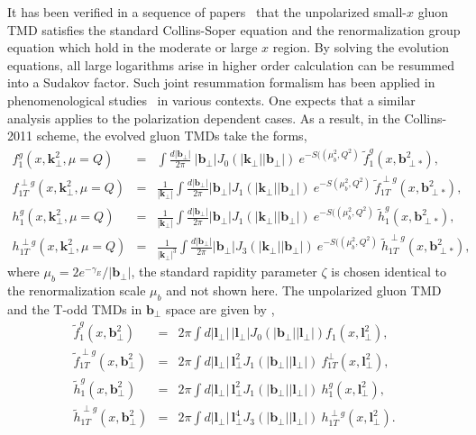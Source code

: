 \documentclass[prd,aps,preprintnumbers,fleqn,showpacs,nofootinbib,superscriptaddress]{revtex4}
\begin{document}
 It has been verified in a sequence of papers~\cite{Mueller:2013wwa,Zhou:2016tfe,Xiao:2017yya,Zhou:2018lfq} that the unpolarized small-$x$ gluon TMD
 satisfies the standard  Collins-Soper equation and the renormalization  group equation which hold in the
 moderate or large $x$ region. By solving the evolution equations, all large logarithms arise in higher
 order calculation can be resummed into a Sudakov factor. Such joint resummation formalism has been applied in  phenomenological studies~\cite{Zheng:2014vka,vanHameren:2014ala,Boer:2017xpy,vanHameren:2019ysa,Stasto:2018rci,Marquet:2019ltn} in various contexts. One expects that a similar analysis applies to the  polarization dependent cases. As a result, in the Collins-2011 scheme, the evolved gluon TMDs take the forms,
 \begin{eqnarray}
  f_{1}^g (x,\bm{k}_\perp^2,\mu=Q)
 &=& \int \frac{ d |\bm{b}_{\perp}|}{2\pi} ~|\bm{b}_{\perp}| J_0(|\bm{k}_{\perp}|| \bm{b}_{\perp}|)~
 e^{-S((\mu_b^2,Q^2)}~
  \tilde f_{1}^g(x,\bm{b}_{\perp*}^2),
\\
   f_{1T}^{\perp g } (x,\bm{k}_\perp^2,\mu=Q)&=& \frac{1}{|\bm{k}_{\perp}|}
  \int\frac{ d |\bm{b}_{\perp}|}{2\pi} |\bm{b}_{\perp}|
  J_1(|\bm{k}_{\perp}||\bm{b}_{\perp}|)~ e^{-S(\mu_b^2,Q^2)}~
    \tilde f_{1T}^{\perp g }(x,\bm{b}_{\perp*}^2), \label{f1t}
\\
h_{1}^{ g}(x,\bm{k}_\perp^2,\mu=Q)&=&\frac{1}{|\bm{k}_{\perp}|}
  \int \frac{ d |\bm{b}_{\perp}|}{2\pi} |\bm{b}_{\perp}|
  J_1(|\bm{k}_{\perp}||\bm{b}_{\perp}|)~e^{-S((\mu_b^2,Q^2)}~
    \tilde h_{1}^{ g}(x, \bm{b}_{\perp*}^2), \label{h1t}
\\
 h_{1T}^{\perp g}(x,\bm{k}_\perp^2,\mu=Q)&=&\frac{1}{|\bm{k}_{\perp}|^3}
  \int \frac{ d |\bm{b}_{\perp}|}{2\pi} |\bm{b}_{\perp}|
  J_3(|\bm{k}_{\perp}||\bm{b}_{\perp}|)~e^{-S((\mu_b^2,Q^2)}~
    \tilde h_{1T}^{\perp g}(x, \bm{b}_{\perp*}^2),
\end{eqnarray}
where $\mu_b=2 e^{-\gamma_E}/|\bm{b}_{\perp}| $,
the standard rapidity parameter $\zeta$ is chosen identical to the renormalization scale $\mu_b$ and 
not shown here.  The unpolarized gluon TMD and the T-odd TMDs  in $\bm{b}_\perp$
space are given by \cite{Boer:2011xd},
\begin{eqnarray}
   \tilde f_{1}^g(x,\bm{b}_{\perp}^2) &=&  2\pi \int d |\bm{l}_{\perp}| \, |\bm{l}_{\perp}| J_0(|\bm{b}_{\perp}||\bm{l}_\perp|)
  f_{1}(x,\bm{l}_\perp^2),
 \label{eqn:xf1DPk}
\\
  \tilde f^{\perp g}_{1T}(x,\bm{b}_{\perp}^2) &=&  2\pi \int d |\bm{l}_{\perp}|\, \bm{l}_\perp^2
J_1(|\bm{b}_{\perp}||\bm{l}_\perp|) ~  f^{\perp }_{1T}(x,\bm{l}_\perp^2), 
\label{eqn:xh1DPk}
\\
  \tilde h^{ g}_{1}(x,\bm{b}_{\perp}^2) &=& 2\pi \int d |\bm{l}_{\perp}| \,  \bm{l}_\perp^2
J_1(|\bm{b}_{\perp}||\bm{l}_\perp|) ~    h^{ g}_{1}(x,\bm{l}_\perp^2),
\\
\tilde h^{ \perp g}_{1T}(x,\bm{b}_{\perp}^2) &=&  2\pi \int d |\bm{l}_{\perp}| \,  \bm{l}_{\perp}^4
J_3(|\bm{b}_{\perp}||\bm{l}_\perp|) ~    h^{ \perp g}_{1T}(x,\bm{l}_\perp^2).
\end{eqnarray}
\end{document}
